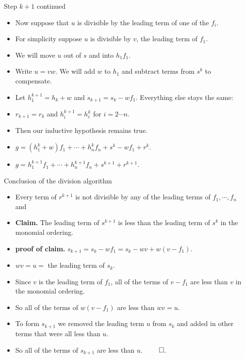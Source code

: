 \documentclass{beamer}
\begin{document}
\begin{frame}{Step $k+1$ continued}

\begin{itemize}
  \item Now suppose that $u$ is divisible by the leading term of one of the $f_i$.
  \item For simplicity suppose $u$ is divisible by $v$, the leading term of $f_1$.
  \item We will move $u$ out of $s$ and into $h_1 f_1$.
  \item Write $u = vw$. We will add $w$ to $h_1$ and subtract terms from $s^k$ to compensate.
  \item Let $h_1^{k+1} = h_k + w$ and $s_{k+1} = s_k - wf_1$. Everything else stays the same:
  \item $r_{k+1} = r_k$ and $h_i^{k+1} = h_i^k$ for $i = 2\cdots n$.
  \item Then our inductive hypothesis remains true.
  \item $g = (h_1^k + w) f_1 + \cdots + h_n^k f_n + s^k - wf_1 + r^k$.
  \item $g = h_1^{k+1} f_1 + \cdots + h_n^{k+1} f_n + s^{k+1} + r^{k+1}$.
\end{itemize}

\end{frame}

\begin{frame}{Conclusion of the division algorithm}

\begin{itemize}
  \item  Every term of $r^{k+1}$ is not divisible by any of the leading terms of $f_1,\cdots, f_n$ and
  \item \textbf{Claim.} The leading term of $s^{k+1}$ is less than the leading term of $s^k$ in the monomial ordering.
  \item \textbf{proof of claim.}  $s_{k+1} = s_k - wf_1 = s_k - wv + w(v - f_1)$.
  \item $wv = u = $ the leading term of $s_k$.
  \item Since $v$ is the leading term of $f_1$, all of the terms of $v -f_1$ are less than $v$ in the monomial ordering.
  \item So all of the terms of $w(v-f_1)$ are less than $wv = u$.
  \item To form $s_{k+1}$ we removed the leading term $u$ from $s_k$ and added in other terms that were all less than $u$.
  \item So all of the terms of $s_{k+1}$ are less than $u$. $\qed$.
\end{itemize}
\end{frame}
\end{document}
